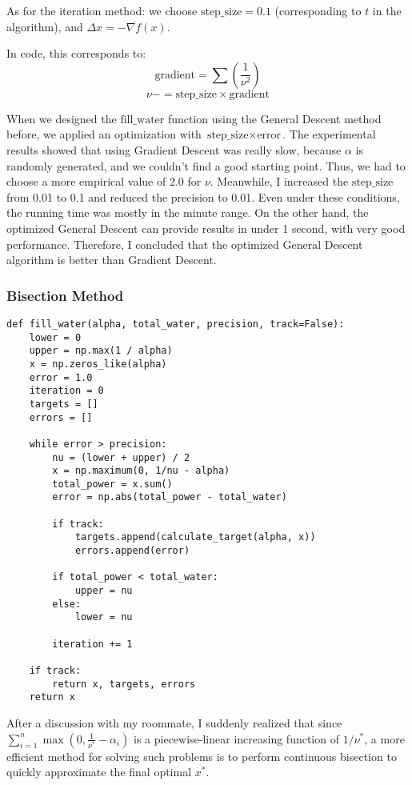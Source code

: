 \documentclass[a4paper,12pt]{article}
\begin{document}
As for the iteration method: we choose \( \text{step\_size} = 0.1 \) (corresponding to \( t \) in the algorithm), and \( \Delta x = -\nabla f(x) \).

In code, this corresponds to:
\[
\text{gradient} = \sum \left( \frac{1}{\nu^2} \right)
\]
\[
\nu -= \text{step\_size} \times \text{gradient}
\]

When we designed the \( \text{fill\_water} \) function using the General Descent method before, we applied an optimization with \( \text{step\_size} \times \text{error} \). The experimental results showed that using Gradient Descent was really slow, because \( \alpha \) is randomly generated, and we couldn't find a good starting point. Thus, we had to choose a more empirical value of 2.0 for \( \nu \). Meanwhile, I increased the \( \text{step\_size} \) from 0.01 to 0.1 and reduced the precision to 0.01. Even under these conditions, the running time was mostly in the minute range. On the other hand, the optimized General Descent can provide results in under 1 second, with very good performance. Therefore, I concluded that the optimized General Descent algorithm is better than Gradient Descent.
    \subsubsection{Bisection Method}
\begin{lstlisting}
def fill_water(alpha, total_water, precision, track=False):
    lower = 0
    upper = np.max(1 / alpha)
    x = np.zeros_like(alpha)
    error = 1.0
    iteration = 0
    targets = []
    errors = []
    
    while error > precision:
        nu = (lower + upper) / 2
        x = np.maximum(0, 1/nu - alpha)
        total_power = x.sum()
        error = np.abs(total_power - total_water)
        
        if track:
            targets.append(calculate_target(alpha, x))
            errors.append(error)
        
        if total_power < total_water:
            upper = nu
        else:
            lower = nu
        
        iteration += 1
        
    if track:
        return x, targets, errors
    return x
\end{lstlisting}

After a discussion with my roommate, I suddenly realized that since \\
$\sum_{i=1}^{n} \max\left(0, \frac{1}{\nu^*} - \alpha_i\right)$
is a piecewise-linear increasing function of $1/\nu^*$, a more efficient method for solving such problems is to perform continuous bisection to quickly approximate the final optimal \( x^* \).
\end{document}
